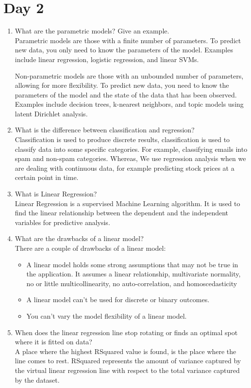 \documentclass[11pt]{article}
\begin{document}
\section{Day 2}
\begin{enumerate}
\item What are the parametric models? Give an example.\\[.5em]
Parametric models are those with a finite number of parameters. To predict new data, you only
need to know the parameters of the model. Examples include linear regression, logistic
regression, and linear SVMs.

Non-parametric models are those with an unbounded number of parameters, allowing for more
flexibility. To predict new data, you need to know the parameters of the model and the state of
the data that has been observed. Examples include decision trees, k-nearest neighbors, and
topic models using latent Dirichlet analysis.

\item What is the difference between classification and regression?\\[.5em]
Classification is used to produce discrete results, classification is used to classify data into some
specific categories. For example, classifying emails into spam and non-spam categories.
Whereas, We use regression analysis when we are dealing with continuous data, for example
predicting stock prices at a certain point in time.

\item What is Linear Regression?\\[.5em]
Linear Regression is a supervised Machine Learning algorithm. It is used to find the linear
relationship between the dependent and the independent variables for predictive analysis.

\item What are the drawbacks of a linear model?\\[.5em]
There are a couple of drawbacks of a linear model:
\begin{itemize}

\item A linear model holds some strong assumptions that may not be true in the application. It
assumes a linear relationship, multivariate normality, no or little multicollinearity, no
auto-correlation, and homoscedasticity
\item A linear model can’t be used for discrete or binary outcomes.
\item You can’t vary the model flexibility of a linear model.
\end{itemize}

\item When does the linear regression line stop rotating or finds an optimal spot where it
is fitted on data?\\[.5em]
A place where the highest RSquared value is found, is the place where the line comes to rest.
RSquared represents the amount of variance captured by the virtual linear regression line with
respect to the total variance captured by the dataset.
\end{enumerate}
\pagebreak
\end{document}
